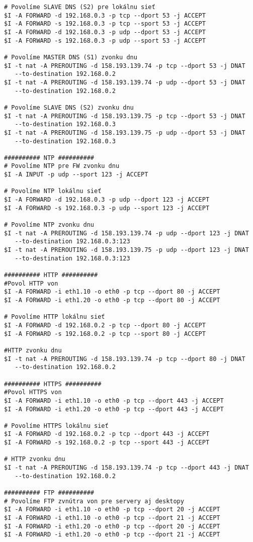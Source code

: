 {\begin{small}
\begin{verbatim}
# Povolíme SLAVE DNS (S2) pre lokálnu sieť
$I -A FORWARD -d 192.168.0.3 -p tcp --dport 53 -j ACCEPT
$I -A FORWARD -s 192.168.0.3 -p tcp --sport 53 -j ACCEPT
$I -A FORWARD -d 192.168.0.3 -p udp --dport 53 -j ACCEPT
$I -A FORWARD -s 192.168.0.3 -p udp --sport 53 -j ACCEPT

# Povolíme MASTER DNS (S1) zvonku dnu
$I -t nat -A PREROUTING -d 158.193.139.74 -p tcp --dport 53 -j DNAT
   --to-destination 192.168.0.2
$I -t nat -A PREROUTING -d 158.193.139.74 -p udp --dport 53 -j DNAT
   --to-destination 192.168.0.2

# Povolíme SLAVE DNS (S2) zvonku dnu
$I -t nat -A PREROUTING -d 158.193.139.75 -p tcp --dport 53 -j DNAT
   --to-destination 192.168.0.3
$I -t nat -A PREROUTING -d 158.193.139.75 -p udp --dport 53 -j DNAT
   --to-destination 192.168.0.3

########## NTP ##########
# Povolíme NTP pre FW zvonku dnu
$I -A INPUT -p udp --sport 123 -j ACCEPT

# Povolíme NTP lokálnu sieť
$I -A FORWARD -d 192.168.0.3 -p udp --dport 123 -j ACCEPT
$I -A FORWARD -s 192.168.0.3 -p udp --sport 123 -j ACCEPT

# Povolíme NTP zvonku dnu
$I -t nat -A PREROUTING -d 158.193.139.74 -p udp --dport 123 -j DNAT
   --to-destination 192.168.0.3:123
$I -t nat -A PREROUTING -d 158.193.139.75 -p udp --dport 123 -j DNAT
   --to-destination 192.168.0.3:123

########## HTTP ##########
#Povol HTTP von
$I -A FORWARD -i eth1.10 -o eth0 -p tcp --dport 80 -j ACCEPT
$I -A FORWARD -i eth1.20 -o eth0 -p tcp --dport 80 -j ACCEPT

# Povolíme HTTP lokálnu sieť
$I -A FORWARD -d 192.168.0.2 -p tcp --dport 80 -j ACCEPT
$I -A FORWARD -s 192.168.0.2 -p tcp --sport 80 -j ACCEPT

#HTTP zvonku dnu
$I -t nat -A PREROUTING -d 158.193.139.74 -p tcp --dport 80 -j DNAT
   --to-destination 192.168.0.2

########## HTTPS ##########
#Povol HTTPS von
$I -A FORWARD -i eth1.10 -o eth0 -p tcp --dport 443 -j ACCEPT
$I -A FORWARD -i eth1.20 -o eth0 -p tcp --dport 443 -j ACCEPT

# Povolíme HTTPS lokálnu sieť
$I -A FORWARD -d 192.168.0.2 -p tcp --dport 443 -j ACCEPT
$I -A FORWARD -s 192.168.0.2 -p tcp --sport 443 -j ACCEPT

# HTTP zvonku dnu
$I -t nat -A PREROUTING -d 158.193.139.74 -p tcp --dport 443 -j DNAT
   --to-destination 192.168.0.2

########## FTP ##########
# Povolíme FTP zvnútra von pre servery aj desktopy
$I -A FORWARD -i eth1.10 -o eth0 -p tcp --dport 20 -j ACCEPT
$I -A FORWARD -i eth1.10 -o eth0 -p tcp --dport 21 -j ACCEPT
$I -A FORWARD -i eth1.20 -o eth0 -p tcp --dport 20 -j ACCEPT
$I -A FORWARD -i eth1.20 -o eth0 -p tcp --dport 21 -j ACCEPT


\end{verbatim}
\end{small}}
